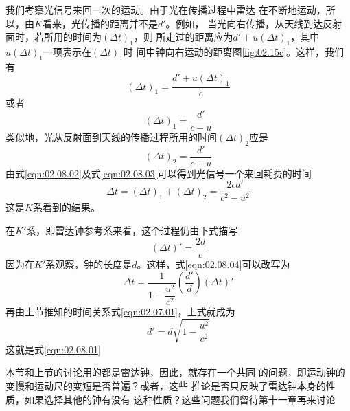 我们考察光信号来回一次的运动。由于光在传播过程中雷达
在不断地运动，所以，由$K$看来，光传播的距离并不是$d'$。例如，
当光向右传播，从天线到达反射面时，若所用的时间为$\left(\Delta t\right)_1$，则
所走过的距离应为$ d ' + u \left( \Delta t \right) _ { 1 }$，其中$ u \left( \Delta t\right) _ { 1 } $一项表示在$\left(\Delta t\right)_1$时
间中钟向右运动的距离\lbr 图\ref{fig:02.15c}\rbr 。这样，我们有
\begin{equation*}
  \left( \Delta t \right) _ { 1 } = \frac { d ' + u \left(\Delta t\right)_1 } { c }
\end{equation*}
或者
\begin{equation}\label{eqn:02.08.02}
  \left( \Delta t \right) _ { 1 } = \frac { d ' } { c - u }
\end{equation}
类似地，光从反射面到天线的传播过程所用的时间$ \left(\Delta t\right)_2 $应是
\begin{equation}\label{eqn:02.08.03}
  \left( \Delta t \right) _ { 2 } = \frac { d ' } { c + u }
\end{equation}
由式\eqref{eqn:02.08.02}及式\eqref{eqn:02.08.03}可以得到光信号一个来回耗费的时间
\begin{equation}\label{eqn:02.08.04}
  \Delta t = \left( \Delta t \right) _ { 1 } + \left( \Delta t \right) _ { 2 } =  \frac { 2 c d ' } { c ^ { 2 } - u ^ { 2 } }
\end{equation}
这是$K$系看到的结果。

在$K'$系，即雷达钟参考系来看，这个过程仍由下式描写
\begin{equation*}
  \left( \Delta t \right) ' = \frac { 2 d } { c }
\end{equation*}
因为在$K'$系观察，钟的长度是$d$。这样，式\eqref{eqn:02.08.04}可以改写为
\begin{equation*}
  \Delta t = \frac { 1 } { 1 - \dfrac { u ^ { 2 } } { c ^ { 2 } } } \left ( \frac { d ' } { d } \right) \left( \Delta t \right) '
\end{equation*}
再由上节推知的时间关系式\eqref{eqn:02.07.01}，上式就成为
\begin{equation*}
  d ' = d \sqrt { 1 - \frac { u ^ { 2 } } { c ^ { 2 } } }
\end{equation*}
\clearpage
\noindent 这就是式\eqref{eqn:02.08.01}

本节和上节的讨论用的都是雷达钟，因此，就存在一个共同
的问题，即运动钟的变慢和运动尺的变短是否普遍？或者，这些
推论是否只反映了雷达钟本身的性质，如果选择其他的钟有没有
这种性质？这些问题我们留待第十一章再来讨论
